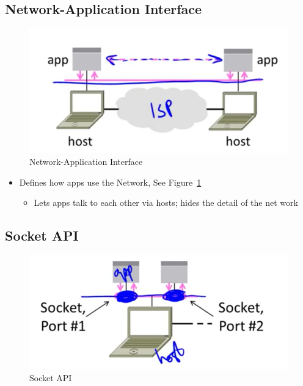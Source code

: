 \documentclass[12pt]{ctexart}   %
\begin{document}
	\subsection{Network-Application Interface}
	
	\begin{figure}[h!] %
	 \centering
	 \includegraphics[scale=1.0]{images/1-4-1}
	\caption{ Network-Application Interface }
	 \label{fig:1-4-1}
	 \end{figure}
	 
	\begin{itemize}
		\item Defines how apps use the Network, See Figure~\ref{fig:1-4-1}
		\begin{itemize}
			\item Lets apps talk to each other via hosts; hides the detail of the net work
		\end{itemize}
	\end{itemize}
	
	\subsection{Socket API}
	
	\begin{figure}[h!] %
	 \centering
	 \includegraphics[scale=1.0]{images/1-4-2}
	\caption{ Socket API }
	 \label{fig:1-4-2}
	 \end{figure}
	 
\end{document}
